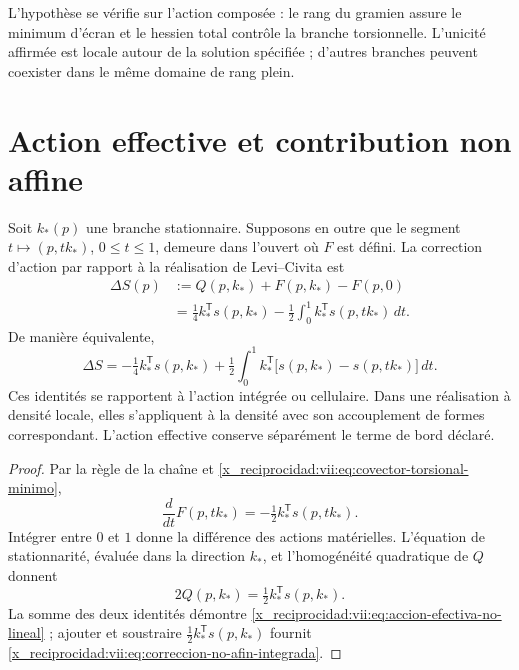 L'hypothèse se vérifie sur l'action composée : le rang du
gramien assure le minimum d'écran et le hessien total contrôle
la branche torsionnelle. L'unicité affirmée est locale autour de la
solution spécifiée ; d'autres branches peuvent coexister dans le même
domaine de rang plein.

\section{Action effective et contribution non affine}
\label{x_reciprocidad:vii:subsec:accion-efectiva-no-afin}

\begin{theorem}
\label{x_reciprocidad:vii:thm:eliminacion-torsional-no-lineal}
Soit \(k_*(p)\) une branche stationnaire. Supposons en outre que le
segment \(t\mapsto (p,tk_*)\), \(0\leq t\leq1\), demeure
dans l'ouvert où \(F\) est défini. La correction d'action
par rapport à la réalisation de Levi--Civita est
\begin{equation}
 \begin{split}
 \Delta S(p)
  &:=Q(p,k_*)+F(p,k_*)-F(p,0)\\
  &=\tfrac14 k_*^{\mathsf T}s(p,k_*)
     -\tfrac12\int_0^1
           k_*^{\mathsf T}s(p,tk_*)\,dt.
 \end{split}
 \label{x_reciprocidad:vii:eq:accion-efectiva-no-lineal}
\end{equation}
De manière équivalente,
\begin{equation}
 \Delta S=-\tfrac14 k_*^{\mathsf T}s(p,k_*)
  +\tfrac12\int_0^1 k_*^{\mathsf T}
       \bigl[s(p,k_*)-s(p,tk_*)\bigr]\,dt.
 \label{x_reciprocidad:vii:eq:correccion-no-afin-integrada}
\end{equation}
Ces identités se rapportent à l'action intégrée ou cellulaire. Dans une réalisation à densité locale, elles s'appliquent à la densité avec son accouplement de formes correspondant. L'action effective conserve séparément le terme de bord déclaré.
\end{theorem}

\begin{proof}
Par la règle de la chaîne et
\eqref{x_reciprocidad:vii:eq:covector-torsional-minimo},
\[
 \frac{d}{dt}F(p,tk_*)
      =-\tfrac12 k_*^{\mathsf T}s(p,tk_*).
\]
Intégrer entre \(0\) et \(1\) donne la différence des actions
matérielles. L'équation de stationnarité, évaluée dans la
direction \(k_*\), et l'homogénéité quadratique de \(Q\) donnent
\[
 2Q(p,k_*)=\tfrac12 k_*^{\mathsf T}s(p,k_*).
\]
La somme des deux identités démontre
\eqref{x_reciprocidad:vii:eq:accion-efectiva-no-lineal} ; ajouter et soustraire
\(\tfrac12k_*^{\mathsf T}s(p,k_*)\) fournit
\eqref{x_reciprocidad:vii:eq:correccion-no-afin-integrada}.
\end{proof}


